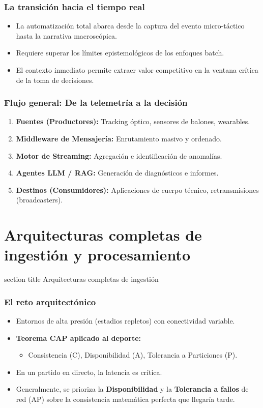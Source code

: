 \documentclass[aspectratio=169]{beamer}
\newcommand{\sectionpagetitle}[1]{
\begin{frame}
	\vspace{1cm}
	\begin{beamercolorbox}[sep=8pt,center,wd=\textwidth]{section title}
		\usebeamerfont{section title}#1\par
	\end{beamercolorbox}
\end{frame}
}
\begin{document}
\begin{frame}\frametitle{La transición hacia el tiempo real}
\begin{itemize}
    \item La automatización total abarca desde la captura del evento micro-táctico hasta la narrativa macroscópica.
    \item Requiere superar los límites epistemológicos de los enfoques batch.
    \item El contexto inmediato permite extraer valor competitivo en la ventana crítica de la toma de decisiones.
\end{itemize}
\end{frame}

\begin{frame}\frametitle{Flujo general: De la telemetría a la decisión}
\begin{enumerate}
    \item \textbf{Fuentes (Productores):} Tracking óptico, sensores de balones, wearables.
    \item \textbf{Middleware de Mensajería:} Enrutamiento masivo y ordenado.
    \item \textbf{Motor de Streaming:} Agregación e identificación de anomalías.
    \item \textbf{Agentes LLM / RAG:} Generación de diagnósticos e informes.
    \item \textbf{Destinos (Consumidores):} Aplicaciones de cuerpo técnico, retransmisiones (broadcasters).
\end{enumerate}
\end{frame}

\section{Arquitecturas completas de ingestión y procesamiento}
\sectionpagetitle{Arquitecturas completas de ingestión}

\begin{frame}\frametitle{El reto arquitectónico}
\begin{itemize}
    \item Entornos de alta presión (estadios repletos) con conectividad variable.
    \item \textbf{Teorema CAP aplicado al deporte:}
    \begin{itemize}
        \item Consistencia (C), Disponibilidad (A), Tolerancia a Particiones (P).
    \end{itemize}
    \item En un partido en directo, la latencia es crítica.
    \item Generalmente, se prioriza la \textbf{Disponibilidad} y la \textbf{Tolerancia a fallos} de red (AP) sobre la consistencia matemática perfecta que llegaría tarde.
\end{itemize}
\end{frame}
\end{document}
